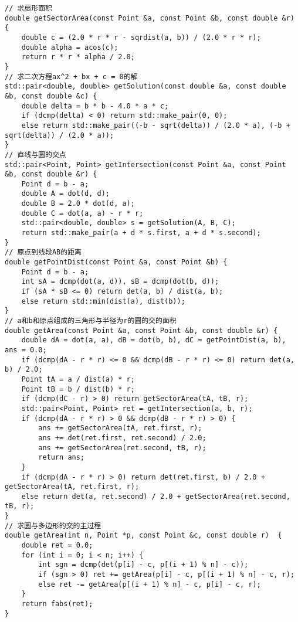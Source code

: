 \begin{lstlisting}
// 求扇形面积
double getSectorArea(const Point &a, const Point &b, const double &r) {
	double c = (2.0 * r * r - sqrdist(a, b)) / (2.0 * r * r);
	double alpha = acos(c);
	return r * r * alpha / 2.0;
}
// 求二次方程ax^2 + bx + c = 0的解
std::pair<double, double> getSolution(const double &a, const double &b, const double &c) {
	double delta = b * b - 4.0 * a * c;
	if (dcmp(delta) < 0) return std::make_pair(0, 0);
	else return std::make_pair((-b - sqrt(delta)) / (2.0 * a), (-b + sqrt(delta)) / (2.0 * a));
}
// 直线与圆的交点
std::pair<Point, Point> getIntersection(const Point &a, const Point &b, const double &r) {
	Point d = b - a;
	double A = dot(d, d);
	double B = 2.0 * dot(d, a);
	double C = dot(a, a) - r * r;
	std::pair<double, double> s = getSolution(A, B, C);
	return std::make_pair(a + d * s.first, a + d * s.second);
}
// 原点到线段AB的距离
double getPointDist(const Point &a, const Point &b) {
	Point d = b - a;
	int sA = dcmp(dot(a, d)), sB = dcmp(dot(b, d));
	if (sA * sB <= 0) return det(a, b) / dist(a, b);
	else return std::min(dist(a), dist(b));
}
// a和b和原点组成的三角形与半径为r的圆的交的面积
double getArea(const Point &a, const Point &b, const double &r) {
	double dA = dot(a, a), dB = dot(b, b), dC = getPointDist(a, b), ans = 0.0;
	if (dcmp(dA - r * r) <= 0 && dcmp(dB - r * r) <= 0) return det(a, b) / 2.0;
	Point tA = a / dist(a) * r;
	Point tB = b / dist(b) * r;
	if (dcmp(dC - r) > 0) return getSectorArea(tA, tB, r);
	std::pair<Point, Point> ret = getIntersection(a, b, r);
	if (dcmp(dA - r * r) > 0 && dcmp(dB - r * r) > 0) {
		ans += getSectorArea(tA, ret.first, r);
		ans += det(ret.first, ret.second) / 2.0;
		ans += getSectorArea(ret.second, tB, r);
		return ans;
	}
	if (dcmp(dA - r * r) > 0) return det(ret.first, b) / 2.0 + getSectorArea(tA, ret.first, r);
	else return det(a, ret.second) / 2.0 + getSectorArea(ret.second, tB, r);
}
// 求圆与多边形的交的主过程
double getArea(int n, Point *p, const Point &c, const double r)  {
	double ret = 0.0;
	for (int i = 0; i < n; i++) {
		int sgn = dcmp(det(p[i] - c, p[(i + 1) % n] - c));
		if (sgn > 0) ret += getArea(p[i] - c, p[(i + 1) % n] - c, r);
		else ret -= getArea(p[(i + 1) % n] - c, p[i] - c, r);
	}
	return fabs(ret);
}
\end{lstlisting}
